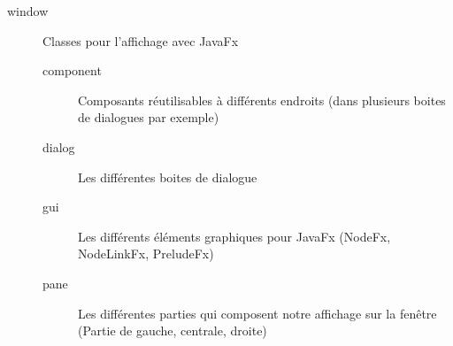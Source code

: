 \begin{description}
			\item[window]{Classes pour l'affichage avec JavaFx}
			\begin{description}
				\item[component]{Composants réutilisables à différents endroits (dans plusieurs boites de dialogues par exemple)}
				\item[dialog]{Les différentes boites de dialogue}
				\item[gui]{Les différents éléments graphiques pour JavaFx (NodeFx, NodeLinkFx, PreludeFx)}
				\item[pane]{Les différentes parties qui composent notre affichage sur la fenêtre (Partie de gauche, centrale, droite)}
			\end{description}
		\end{description}
